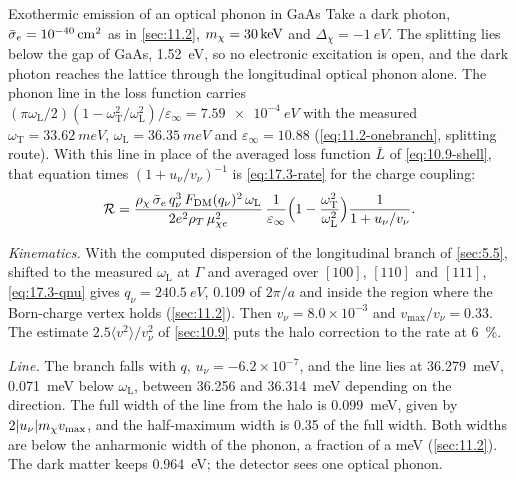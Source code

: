 \begin{workedexample}{Exothermic emission of an optical phonon in GaAs}\label{we:17-gaas}
Take a dark photon, $\bar{\sigma}_{e} = \SI{e-40}{cm^2}$ as in \cref{sec:11.2}, $m_{\chi} = \SI{30}{keV}$ and $\Delta_\chi = \SI{-1}{eV}$. The splitting lies below the gap of GaAs, \SI{1.52}{eV}, so no electronic excitation is open, and the dark photon reaches the lattice through the longitudinal optical phonon alone. The phonon line in the loss function carries $(\pi\omega_{\mathrm{L}}/2)(1 - \omega_{\mathrm{T}}^2/\omega_{\mathrm{L}}^2)/\varepsilon_\infty = \SI{7.59e-4}{eV}$ with the measured $\omega_{\mathrm{T}} = \SI{33.62}{meV}$, $\omega_{\mathrm{L}} = \SI{36.35}{meV}$ and $\varepsilon_\infty = 10.88$ (\cref{eq:11.2-onebranch}, splitting route). With this line in place of the averaged loss function $\bar L$ of \cref{eq:10.9-shell}, that equation times $(1 + u_\nu/v_\nu)^{-1}$ is \cref{eq:17.3-rate} for the charge coupling:
\begin{equation*}
  \mathcal{R} = \frac{\rho_\chi\,\bar{\sigma}_{e}\,q_\nu^3\,F_{\mathrm{DM}}(q_\nu)^2\,\omega_{\mathrm{L}}}{2e^2\rho_T\,\mu_{\chi e}^2}\,\frac{1}{\varepsilon_\infty}\Bigl(1 - \frac{\omega_{\mathrm{T}}^2}{\omega_{\mathrm{L}}^2}\Bigr)\frac{1}{1 + u_\nu/v_\nu} .
\end{equation*}

\emph{Kinematics.} With the computed dispersion of the longitudinal branch of \cref{sec:5.5}, shifted to the measured $\omega_{\mathrm{L}}$ at $\Gamma$ and averaged over $[100]$, $[110]$ and $[111]$, \cref{eq:17.3-qnu} gives $q_\nu = \SI{240.5}{eV}$, 0.109 of $2\pi/a$ and inside the region where the Born-charge vertex holds (\cref{sec:11.2}). Then $v_\nu = 8.0\times10^{-3}$ and $v_{\mathrm{max}}/v_\nu = 0.33$. The estimate $2.5\langle v^2\rangle/v_\nu^2$ of \cref{sec:10.9} puts the halo correction to the rate at \SI{6}{\percent}.

\emph{Line.} The branch falls with $q$, $u_\nu = -6.2\times10^{-7}$, and the line lies at \SI{36.279}{meV}, \SI{0.071}{meV} below $\omega_{\mathrm{L}}$, between 36.256 and \SI{36.314}{meV} depending on the direction. The full width of the line from the halo is \SI{0.099}{meV}, given by $2|u_\nu|m_{\chi} v_{\mathrm{max}}$, and the half-maximum width is 0.35 of the full width. Both widths are below the anharmonic width of the phonon, a fraction of a meV (\cref{sec:11.2}). The dark matter keeps \SI{0.964}{eV}; the detector sees one optical phonon.


\end{workedexample}
